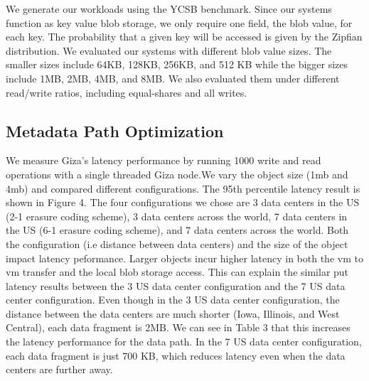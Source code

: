 We generate our workloads using the YCSB benchmark. Since our systems function as key value blob storage, we only require one field, the blob value, for each key. The probability that a given key will be accessed is given by the Zipfian distribution. We evaluated our systems with different blob value sizes. The smaller sizes include 64KB, 128KB, 256KB, and 512 KB while the bigger sizes include 1MB, 2MB, 4MB, and 8MB. We also evaluated them under different read/write ratios, including equal-shares and all writes.

\subsection{Metadata Path Optimization}
We measure Giza's latency performance by running 1000 write and read operations with a single threaded Giza node.We vary the object size (1mb and 4mb) and compared different configurations. 
The 95th percentile latency result is shown in Figure 4. The four configurations we chose are 3 data centers in the US (2-1 erasure coding scheme), 3 data centers across the world, 7 data centers in the US (6-1 erasure coding scheme), and 7 data centers across the world. Both the configuration (i.e distance between data centers) and the size of the object impact latency peformance. Larger objects incur higher latency in both the vm to vm transfer and the local blob storage access. This can explain the similar put latency results between the 3 US data center configuration and the 7 US data center configuration. Even though in the 3 US data center configuration, the distance between the data centers are much shorter (Iowa, Illinois, and West Central), each data fragment is 2MB. We can see in Table 3 that this increases the latency performance for the data path. In the 7 US data center configuration, each data fragment is just 700 KB, which reduces latency even when the data centers are further away. 

